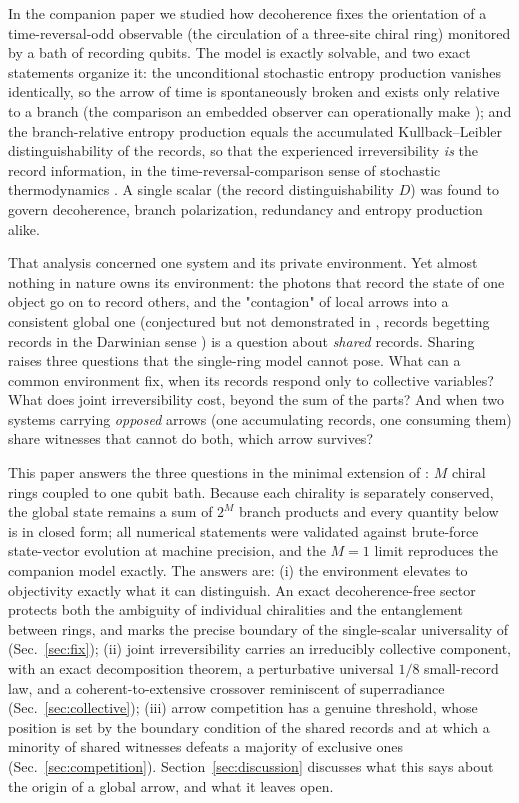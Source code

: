 \documentclass[11pt]{article}
\begin{document}
In the companion paper \cite{Lejri2026} we studied how decoherence fixes the orientation of a time-reversal-odd observable (the circulation of a three-site chiral ring) monitored by a bath of recording qubits. The model is exactly solvable, and two exact statements organize it: the unconditional stochastic entropy production vanishes identically, so the arrow of time is spontaneously broken and exists only relative to a branch (the comparison an embedded observer can operationally make \cite{Mlodinow2014}); and the branch-relative entropy production equals the accumulated Kullback--Leibler distinguishability of the records, so that the experienced irreversibility \emph{is} the record information, in the time-reversal-comparison sense of stochastic thermodynamics \cite{Maes2003,Callens2004,Landi2021}. A single scalar (the record distinguishability $D$) was found to govern decoherence, branch polarization, redundancy and entropy production alike.

That analysis concerned one system and its private environment. Yet almost nothing in nature owns its environment: the photons that record the state of one object go on to record others, and the "contagion" of local arrows into a consistent global one (conjectured but not demonstrated in \cite{Lejri2026}, records begetting records in the Darwinian sense \cite{Zurek2009,Zurek2022}) is a question about \emph{shared} records. Sharing raises three questions that the single-ring model cannot pose. What can a common environment fix, when its records respond only to collective variables? What does joint irreversibility cost, beyond the sum of the parts? And when two systems carrying \emph{opposed} arrows (one accumulating records, one consuming them) share witnesses that cannot do both, which arrow survives?

This paper answers the three questions in the minimal extension of \cite{Lejri2026}: $M$ chiral rings coupled to one qubit bath. Because each chirality is separately conserved, the global state remains a sum of $2^M$ branch products and every quantity below is in closed form; all numerical statements were validated against brute-force state-vector evolution at machine precision, and the $M{=}1$ limit reproduces the companion model exactly. The answers are: (i) the environment elevates to objectivity exactly what it can distinguish. An exact decoherence-free sector protects both the ambiguity of individual chiralities and the entanglement between rings, and marks the precise boundary of the single-scalar universality of \cite{Lejri2026} (Sec.~\ref{sec:fix}); (ii) joint irreversibility carries an irreducibly collective component, with an exact decomposition theorem, a perturbative universal $1/8$ small-record law, and a coherent-to-extensive crossover reminiscent of superradiance (Sec.~\ref{sec:collective}); (iii) arrow competition has a genuine threshold, whose position is set by the boundary condition of the shared records and at which a minority of shared witnesses defeats a majority of exclusive ones (Sec.~\ref{sec:competition}). Section~\ref{sec:discussion} discusses what this says about the origin of a global arrow, and what it leaves open.
\end{document}

